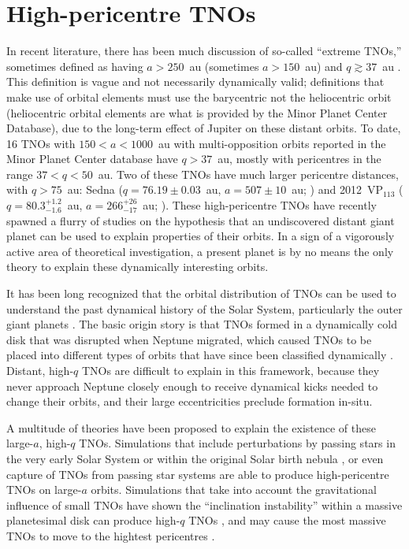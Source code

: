 \documentclass[preprint]{aastex62}
\begin{document}
\section{High-pericentre TNOs} \label{sec:highq}

In recent literature, there has been much discussion of so-called ``extreme TNOs,'' sometimes defined as having $a>250$~au (sometimes $a>150$~au) and $q\gtrsim37$~au \citep{Sheppardetal2016,bannister17}.
This definition is vague and not necessarily dynamically valid; definitions that make use of orbital elements must use the barycentric not the heliocentric orbit (heliocentric orbital elements are what is provided by the Minor Planet Center Database), due to the long-term effect of Jupiter on these distant orbits.
To date, 16  TNOs with $150<a<1000$~au with multi-opposition orbits reported in the Minor Planet Center database have $q>37$~au, mostly with pericentres in the range $37<q<50$~au.
Two of these TNOs have much larger pericentre distances, with $q>75$~au: Sedna ($q=76.19 \pm 0.03$~au, $a=507 \pm 10$~au; \citealt{brownetal04}) and 2012~VP$_{113}$ ($q=80.3^{+1.2}_{-1.6}$~au, $a = 266^{+26}_{-17}$~au; \citealt{trujillosheppard14}). 
These high-pericentre TNOs have recently spawned a flurry of studies on the hypothesis that an undiscovered distant giant planet can be used to explain properties of their orbits. 
In a sign of a vigorously active area of theoretical investigation, a present planet is by no means the only theory to explain these dynamically interesting orbits.

It has been long recognized that the orbital distribution of TNOs can be used to understand the past dynamical history of the Solar System, particularly the outer giant planets \citep{malhotra93,levison08}.
The basic origin story is that TNOs formed in a dynamically cold disk that was disrupted when Neptune migrated, which caused TNOs to be placed into different types of orbits that have since been classified dynamically \citep[see][]{gladman08}.  
Distant, high-$q$ TNOs are difficult to explain in this framework, because they never approach Neptune closely enough to receive dynamical kicks needed to change their orbits, and their large eccentricities preclude formation in-situ.  

A multitude of theories have been proposed to explain the existence of these large-$a$, high-$q$ TNOs.
Simulations that include perturbations by passing stars in the very early Solar System \citep{kenyonbromley04,morbidellilevison04,KaibQuinn2008,Pfalzneretal2018} or within the original Solar birth nebula \citep{brasser12,brasserschwamb15}, or even capture of TNOs from passing star systems \citep{kenyonbromley04,Jilkovaetal2015} are able to produce high-pericentre TNOs on large-$a$ orbits.
Simulations that take into account the gravitational influence of small TNOs have shown the ``inclination instability'' within a massive planetesimal disk can produce high-$q$ TNOs \citep{madigan2016}, and may cause the most massive TNOs to move to the hightest pericentres \citep{Fleisigetal2018}.
\end{document}
